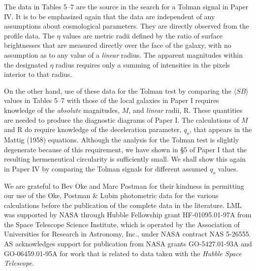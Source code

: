 \documentclass[preprint]{aastex}
\begin{document}
The data in Tables 5--7 are the source in the search for a Tolman
signal in Paper IV. It is to be emphasized again that the data are
independent of any assumptions about cosmological parameters. They are
directly observed from the profile data. The $\eta$ values are metric
radii defined by the ratio of surface brightnesses that are measured
directly over the face of the galaxy, with no assumption as to any
value of a {\it linear} radius. The apparent magnitudes within the
designated $\eta$ radius requires only a summing of intensities in the
pixels interior to that radius.

On the other hand, use of these data for the Tolman test by comparing
the $\langle SB \rangle$ values in Tables 5--7 with those of the local
galaxies in Paper I requires knowledge of the {\it absolute}
magnitudes, $M$, and {\it linear} radii, R. These quantities are
needed to produce the diagnostic diagrams of Paper I. The calculations
of $M$ and R do require knowledge of the deceleration parameter,
$q_o$, that appears in the Mattig (1958) equations. Although the
analysis for the Tolman test is slightly degenerate because of this
requirement, we have shown in \S 5 of Paper I that the resulting
hermeneutical circularity is sufficiently small. We shall show this
again in Paper IV by comparing the Tolman signals for different
assumed $q_o$ values.


\acknowledgments 

We are grateful to Bev Oke and Marc Postman for their kindness in
permitting our use of the Oke, Postman \& Lubin photometric data for
the various calculations before the publication of the complete data
in the literature. LML was supported by NASA through Hubble Fellowship
grant HF-01095.01-97A from the Space Telescope Science Institute,
which is operated by the Association of Universities for Research in
Astronomy, Inc., under NASA contract NAS 5-26555. AS acknowledges
support for publication from NASA grants GO-5427.01-93A and
GO-06459.01-95A for work that is related to data taken with the {\it
Hubble Space Telescope}.


\newpage
\end{document}
